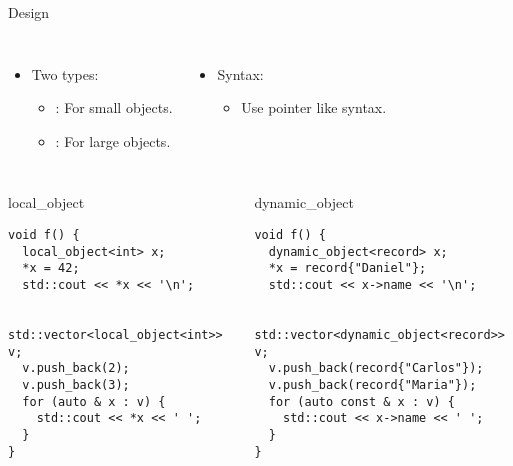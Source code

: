 \begin{frame}[t,fragile]{Design}

\begin{columns}[T]

\begin{itemize}
  \item Two types:
    \begin{itemize}
      \item {}: For small objects.
      \item {}: For large objects.
    \end{itemize}
\end{itemize}

\begin{itemize}
  \item Syntax:
    \begin{itemize}
      \item Use pointer like syntax.
    \end{itemize}
\end{itemize}

\end{columns}

\pause
\begin{columns}[T]

\begin{block}{local\_object}
\begin{lstlisting}
void f() {
  local_object<int> x;
  *x = 42;
  std::cout << *x << '\n';

  std::vector<local_object<int>> v;
  v.push_back(2);
  v.push_back(3);
  for (auto & x : v) {
    std::cout << *x << ' ';
  }
}
\end{lstlisting}
\end{block}

\begin{block}{dynamic\_object}
\begin{lstlisting}
void f() {
  dynamic_object<record> x;
  *x = record{"Daniel"};
  std::cout << x->name << '\n';

  std::vector<dynamic_object<record>> v;
  v.push_back(record{"Carlos"});
  v.push_back(record{"Maria"});
  for (auto const & x : v) {
    std::cout << x->name << ' ';
  }
}
\end{lstlisting}
\end{block}

\end{columns}
\end{frame}
